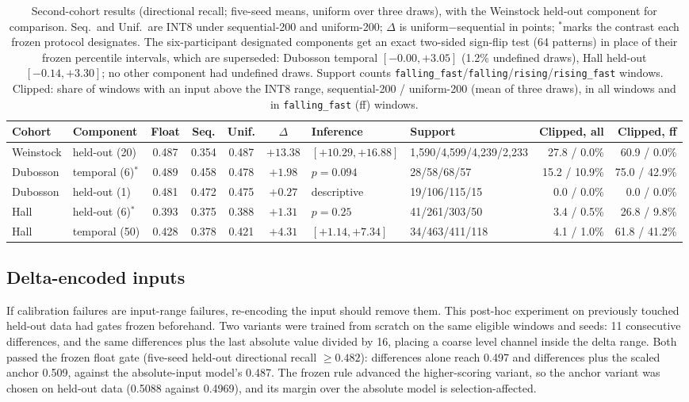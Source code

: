 \documentclass[10pt,twocolumn]{article}
\begin{document}
\begin{table}[t]
\centering
\caption{Second-cohort results (directional recall; five-seed means,
uniform over three draws), with the Weinstock held-out component for
comparison. Seq.\ and Unif.\ are INT8 under sequential-200 and
uniform-200; $\Delta$ is uniform$-$sequential in points; $^\ast$marks the
contrast each frozen protocol designates. The six-participant designated
components get an exact two-sided sign-flip test (64 patterns) in place of
their frozen percentile intervals, which are superseded: Dubosson temporal
$[-0.00, +3.05]$ (1.2\% undefined draws), Hall held-out $[-0.14, +3.30]$;
no other component had undefined draws. Support counts
\texttt{falling\_fast}/\texttt{falling}/\texttt{rising}/\texttt{rising\_fast}
windows. Clipped: share of windows with an input above the INT8 range,
sequential-200 / uniform-200 (mean of three draws), in all windows and in
\texttt{falling\_fast} (ff) windows.}
\label{tab:confirmation}
\footnotesize
\setlength{\tabcolsep}{4pt}
\begin{tabular}{@{}llccccllrr@{}}
\toprule
Cohort & Component & Float & Seq. & Unif. & $\Delta$ & Inference & Support & Clipped, all & Clipped, ff \\
\midrule
Weinstock & held-out (20) & 0.487 & 0.354 & 0.487 & $+13.38$ & $[+10.29, +16.88]$ & 1,590/4,599/4,239/2,233 & 27.8 / 0.0\% & 60.9 / 0.0\% \\
Dubosson & temporal (6)$^\ast$ & 0.489 & 0.458 & 0.478 & $+1.98$ & $p=0.094$ & 28/58/68/57 & 15.2 / 10.9\% & 75.0 / 42.9\% \\
Dubosson & held-out (1) & 0.481 & 0.472 & 0.475 & $+0.27$ & descriptive & 19/106/115/15 & 0.0 / 0.0\% & 0.0 / 0.0\% \\
Hall & held-out (6)$^\ast$ & 0.393 & 0.375 & 0.388 & $+1.31$ & $p=0.25$ & 41/261/303/50 & 3.4 / 0.5\% & 26.8 / 9.8\% \\
Hall & temporal (50) & 0.428 & 0.378 & 0.421 & $+4.31$ & $[+1.14, +7.34]$ & 34/463/411/118 & 4.1 / 1.0\% & 61.8 / 41.2\% \\
\bottomrule
\end{tabular}
\end{table}

\subsection{Delta-encoded inputs}
\label{sec:deltainputs}

If calibration failures are input-range failures, re-encoding the input
should remove them. This post-hoc experiment on previously touched
held-out data had gates frozen beforehand. Two variants were trained from
scratch on the same eligible windows and seeds: 11 consecutive
differences, and the same differences plus the last absolute value divided
by 16, placing a coarse level channel inside the delta range. Both passed
the frozen float gate (five-seed held-out directional recall
$\geq 0.482$): differences alone reach 0.497 and differences plus the
scaled anchor 0.509, against the absolute-input model's 0.487. The frozen
rule advanced the higher-scoring variant, so the anchor variant was chosen
on held-out data (0.5088 against 0.4969), and its margin over the absolute
model is selection-affected.
\end{document}
